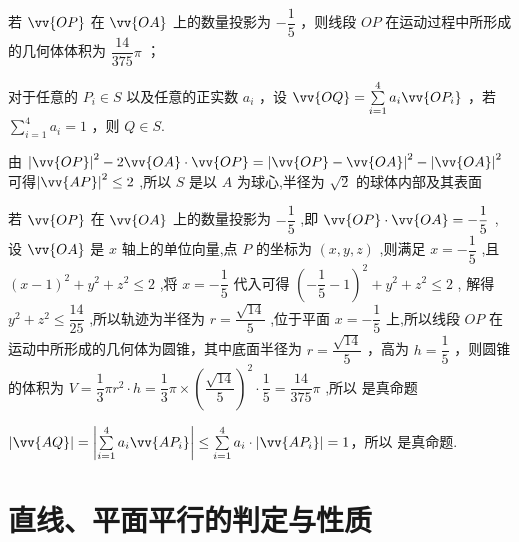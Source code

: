 \begin{enumerate}
      若 $\vv{OP}$ 在 $\vv{OA}$ 上的数量投影为 $- \dfrac{1}{5}$ ，则线段 ${OP}$ 在运动过程中所形成的几何体体积为 $\dfrac{14}{375}\pi$ ；

      对于任意的 ${P}_{i} \in  S$ 以及任意的正实数 ${a}_{i}$ ，设 $\vv{OQ} = \mathop{\sum }\limits_{{i = 1}}^{4}{a}_{i}\vv{O{P}_{i}}$ ，若 $\mathop{\sum }\limits_{{i = 1}}^{4}{a}_{i} = 1$ ，则 $Q \in  S$.

    \begin{jieda}
        由 ${\left| \vv{OP}\right| }^{2} - 2\vv{OA} \cdot  \vv{OP} = {\left| \vv{OP} - \vv{OA}\right| }^{2} - {\left| \vv{OA}\right| }^{2}$可得${\left| \vv{AP}\right| }^{2} \leq  2$ ,所以 $S$ 是以 $A$ 为球心,半径为 $\sqrt{2}$ 的球体内部及其表面
        
          若 $\vv{OP}$ 在 $\vv{OA}$ 上的数量投影为 $- \dfrac{1}{5}$ ,即 $\vv{OP} \cdot  \vv{OA} =  - \dfrac{1}{5}$ ,设 $\vv{OA}$ 是 $x$ 轴上的单位向量,点 $P$ 的坐标为 $\left( {x,y,z}\right)$ ,则满足 $x =  - \dfrac{1}{5}$ ,且 ${\left( x - 1\right) }^{2} +  {y}^{2} + {z}^{2} \leq  2$ ,将 $x =  - \dfrac{1}{5}$ 代入可得 ${\left( -\dfrac{1}{5} - 1\right) }^{2} + {y}^{2} + {z}^{2} \leq  2$ , 解得 ${y}^{2} + {z}^{2} \leq  \dfrac{14}{25}$ ,所以轨迹为半径为 $r = \dfrac{\sqrt{14}}{5}$ ,位于平面 $x =  - \dfrac{1}{5}$ 上,所以线段 ${OP}$ 在运动中所形成的几何体为圆锥，其中底面半径为 $r = \dfrac{\sqrt{14}}{5}$ ，高为 $h = \dfrac{1}{5}$ ，则圆锥的体积为 $V = \dfrac{1}{3}\pi {r}^{2} \cdot  h = \dfrac{1}{3}\pi  \times  {\left( \dfrac{\sqrt{14}}{5}\right) }^{2} \cdot  \dfrac{1}{5} = \dfrac{14}{375}\pi$ ,所以  是真命题
        
         $\left|\vv{AQ}\right| = \left|\mathop{\sum }\limits_{{i = 1}}^{4}{a}_{i}\vv{A{P}_{i}}\right| \leq \mathop{\sum }\limits_{{i = 1}}^{4}{a}_{i} \cdot \left|\vv{A{P}_{i}}\right| = 1$，所以  是真命题.
    \end{jieda}
\end{enumerate}
\section*{直线、平面平行的判定与性质}


